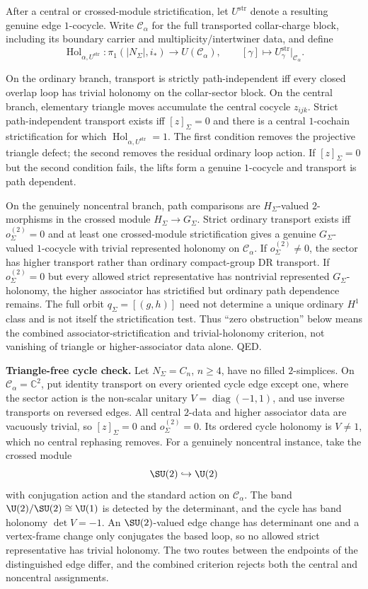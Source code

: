 After a central or crossed-module strictification, let \(U^{\mathrm{str}}\) denote a resulting
genuine edge \(1\)-cocycle. Write \(\mathcal C_\alpha\) for the full transported collar-charge block,
including its boundary carrier and multiplicity/intertwiner data, and define
\[
\operatorname{Hol}_{\alpha,U^{\mathrm{str}}}:\pi_1(|N_\Sigma|,i_*)\longrightarrow U(\mathcal C_\alpha),
\qquad
[\gamma]\longmapsto U^{\mathrm{str}}_\gamma\big|_{\mathcal C_\alpha}.
\]

On the ordinary branch, transport is strictly path-independent iff every closed overlap loop has trivial holonomy on the collar-sector block. On the central branch, elementary triangle moves accumulate the central cocycle \(z_{ijk}\). Strict path-independent transport exists iff \([z]_\Sigma=0\) and there is a central \(1\)-cochain strictification for which \(\operatorname{Hol}_{\alpha,U^{\mathrm{str}}}=1\). The first condition removes the projective triangle defect; the second removes the residual ordinary loop action. If \([z]_\Sigma=0\) but the second condition fails, the lifts form a genuine \(1\)-cocycle and transport is path dependent.

On the genuinely noncentral branch, path comparisons are \(H_\Sigma\)-valued \(2\)-morphisms in
the crossed module \(H_\Sigma\to G_\Sigma\). Strict ordinary transport exists iff
\(o^{(2)}_\Sigma=0\) and at least one crossed-module strictification gives a genuine
\(G_\Sigma\)-valued \(1\)-cocycle with trivial represented holonomy on \(\mathcal C_\alpha\). If
\(o^{(2)}_\Sigma\ne0\), the sector has higher transport rather than ordinary compact-group DR
transport. If \(o^{(2)}_\Sigma=0\) but every allowed strict representative has nontrivial
represented \(G_\Sigma\)-holonomy, the higher associator has strictified but ordinary path
dependence remains. The full orbit \(q_\Sigma=[(g,h)]\) need not determine a unique ordinary
\(H^1\) class and is not itself the strictification test. Thus
``zero obstruction'' below means the combined associator-strictification and trivial-holonomy
criterion, not vanishing of triangle or higher-associator data alone. QED.

\textbf{Triangle-free cycle check.} Let \(N_\Sigma=C_n\), \(n\ge4\), have no filled
\(2\)-simplices. On \(\mathcal C_\alpha=\mathbb C^2\), put identity transport on every oriented
cycle edge except one, where the sector action is the non-scalar unitary
\(V=\operatorname{diag}(-1,1)\), and use inverse transports on reversed edges. All central
\(2\)-data and higher associator data are vacuously trivial, so \([z]_\Sigma=0\) and
\(o^{(2)}_\Sigma=0\). Its ordered cycle holonomy is \(V\ne1\), which no central rephasing removes.
For a genuinely noncentral instance, take the crossed module
\[
\SU(2)\hookrightarrow\U(2)
\]
with conjugation action and the standard action on \(\mathcal C_\alpha\). The band
\(\U(2)/\SU(2)\cong\U(1)\) is detected by the determinant, and the cycle has band holonomy
\(\det V=-1\). An \(\SU(2)\)-valued edge change has determinant one and a vertex-frame change only
conjugates the based loop, so no allowed strict representative has trivial holonomy. The two routes
between the endpoints of the distinguished edge differ, and the combined criterion rejects both
the central and noncentral assignments.

